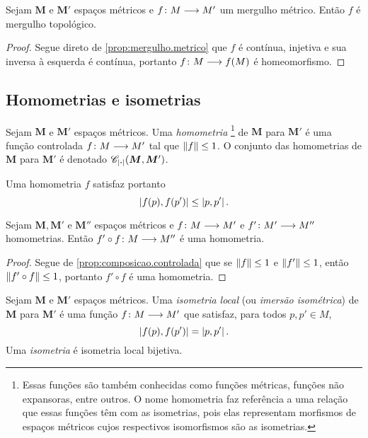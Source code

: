\begin{proposition}
\label{prop:mergulho.metrico.topologico}
Sejam $\bm M$ e $\bm M'$ espaços métricos e ${f}\colon {M} \longrightarrow {M'}$ um mergulho métrico. Então $f$ é mergulho topológico.
\end{proposition}
\begin{proof}
Segue direto de \ref{prop:mergulho.metrico} que $f$ é contínua, injetiva e sua inversa à esquerda é contínua, portanto ${f}\colon {M} \longrightarrow {f(M)}$ é homeomorfismo.
\end{proof}

\subsection{Homometrias e isometrias}

\begin{definition}
Sejam $\bm M$ e $\bm M'$ espaços métricos. Uma \emph{homometria}%
	\footnote{Essas funções são também conhecidas como funções métricas, funções não expansoras, entre outros. O nome homometria faz referência a uma relação que essas funções têm com as isometrias, pois elas representam morfismos de espaços métricos cujos respectivos isomorfismos são as isometrias.} %
de $\bm M$ para $\bm M'$ é uma função controlada ${f}\colon {M} \longrightarrow {M'}$ tal que $\left\Vert{f}\right\Vert \leq 1$.
O conjunto das homometrias de $\bm M$ para $\bm M'$ é denotado $\mathscr{C}_{\vert \bm{\cdot} \vert}(\bm M,\bm M')$.
\end{definition}

Uma homometria $f$ satisfaz portanto
	\begin{equation*}
	\left\vert{f(p)},{f(p')}\right\vert \leq \left\vert{p},{p'}\right\vert.
	\end{equation*}

\begin{proposition}
\label{prop:composicao.homometria}
Sejam $\bm M, \bm M'$ e $\bm M''$ espaços métricos e ${f}\colon {M} \longrightarrow {M'}$ e ${f'}\colon {M'} \longrightarrow {M''}$ homometrias. Então ${f' \circ f}\colon {M} \longrightarrow {M''}$ é uma homometria.
\end{proposition}
\begin{proof}
Segue de \ref{prop:composicao.controlada} que se $\left\Vert{f}\right\Vert \leq 1$ e $\left\Vert{f'}\right\Vert \leq 1$, então $\left\Vert{f' \circ f}\right\Vert \leq 1$, portanto $f' \circ f$ é uma homometria.
\end{proof}

\begin{definition}
Sejam $\bm{M}$ e $\bm{M'}$ espaços métricos. Uma \emph{isometria local} (ou \emph{imersão isométrica}) de $\bm{M}$ para $\bm{M'}$ é uma função ${f}\colon {M} \longrightarrow {M'}$ que satisfaz, para todos $p,p' \in M$,
	\begin{equation*}
	\left\vert{f(p)},{f(p')}\right\vert = \left\vert{p},{p'}\right\vert.
	\end{equation*}
Uma \emph{isometria} é isometria local bijetiva.
\end{definition}

